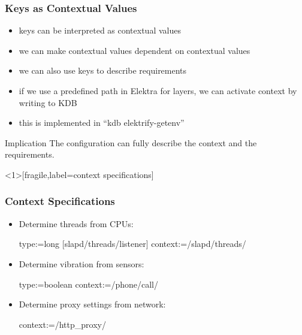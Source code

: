 \begin{frame}
	\frametitle{Keys as Contextual Values}

	\begin{itemize}[<+-| alert@+>]
	\item keys can be interpreted as contextual values~\cite{raab2016persistent,raab2017introducing}
	\item we can make contextual values dependent on contextual values
	\item we can also use keys to describe requirements
	\item if we use a predefined path in Elektra for layers, we can activate context by writing to KDB
	\item this is implemented in ``kdb elektrify-getenv''
	\end{itemize}

	\pause[\thebeamerpauses]

	\begin{alertblock}{Implication}
	The configuration can fully describe the context and the requirements.
	\end{alertblock}
\end{frame}

\begin{frame}<1>[fragile,label=context specifications]
	\frametitle{Context Specifications}

	\begin{itemize}
	\item
	Determine threads from CPUs:

	\begin{code}
	  type:=long
	[slapd/threads/listener]
	  context:=/slapd/threads/%
	\end{code}

	\item
	Determine vibration from sensors:

	\begin{code}
	  type:=boolean
	  context:=/phone/call/%
	\end{code}

	\item
	Determine proxy settings from network:

	\begin{code}
	  context:=/http_proxy/%
	\end{code}
	\end{itemize}
\end{frame}



